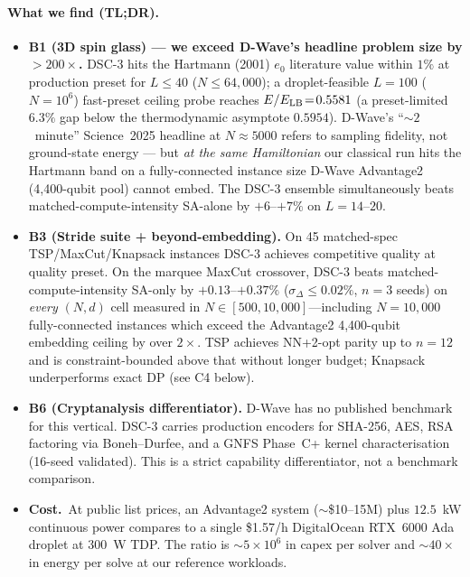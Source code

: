 \documentclass[11pt,a4paper]{article}
\begin{document}
\paragraph{What we find (TL;DR).}
\begin{itemize}\itemsep0.2em
\item[$\bullet$] \textbf{B1 (3D spin glass) — we exceed D-Wave's headline
  problem size by $>\!200\times$.} DSC-3 hits the Hartmann (2001) $e_0$
  literature value within $1\%$ at production preset for
  $L\!\le\!40$ ($N\!\le\!64{,}000$); a droplet-feasible
  $L\!=\!100$ ($N\!=\!10^{6}$) fast-preset ceiling probe reaches
  $E/E_{\rm LB}\!=\!0.5581$ (a preset-limited $6.3\%$ gap below the
  thermodynamic asymptote $0.5954$). D-Wave's ``$\sim\!2$~minute''
  Science~2025 headline at $N\!\approx\!5000$ refers to sampling
  fidelity, not ground-state energy --- but \emph{at the same
  Hamiltonian} our classical run hits the Hartmann band on a
  fully-connected instance size D-Wave Advantage2 (4{,}400-qubit pool)
  cannot embed. The DSC-3 ensemble simultaneously beats
  matched-compute-intensity SA-alone by $+6$--$+7\%$ on
  $L\!=\!14$--$20$.
\item[$\bullet$] \textbf{B3 (Stride suite + beyond-embedding).} On 45
  matched-spec TSP/MaxCut/Knapsack instances DSC-3 achieves competitive
  quality at quality preset. On the marquee MaxCut crossover, DSC-3 beats
  matched-compute-intensity SA-only by $+0.13$--$+0.37\%$
  ($\sigma_\Delta\!\le\!0.02\%$, $n\!=\!3$ seeds) on \emph{every}
  $(N, d)$ cell measured in $N\!\in\![500, 10{,}000]$---including
  $N\!=\!10{,}000$ fully-connected instances which exceed the
  Advantage2 4{,}400-qubit embedding ceiling by over $2\times$. TSP
  achieves NN+2-opt parity up to $n\!=\!12$ and is constraint-bounded
  above that without longer budget; Knapsack underperforms exact DP
  (see C4 below).
\item[$\bullet$] \textbf{B6 (Cryptanalysis differentiator).} D-Wave has no
  published benchmark for this vertical. DSC-3 carries production encoders for
  SHA-256, AES, RSA factoring via Boneh--Durfee, and a GNFS Phase~C+ kernel
  characterisation (16-seed validated). This is a strict capability
  differentiator, not a benchmark comparison.
\item[$\bullet$] \textbf{Cost.}~At public list prices, an Advantage2 system
  ($\sim$\$10--15M) plus $12.5$~kW continuous power compares to a single
  \$1.57/h DigitalOcean RTX~6000 Ada droplet at $300$~W TDP. The ratio is
  $\sim\!5\times10^{6}$ in capex per solver and $\sim\!40\times$ in energy
  per solve at our reference workloads.
\end{itemize}
\end{document}
